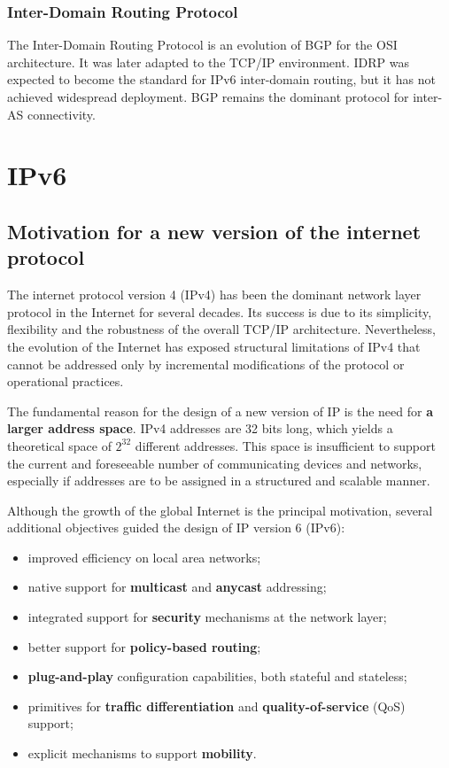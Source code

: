 \documentclass[11pt,a4paper,openany]{report}
\begin{document}
\subsection{Inter-Domain Routing Protocol}

The Inter-Domain Routing Protocol is an evolution of BGP for the OSI architecture. It was later adapted to the TCP/IP environment. IDRP was expected to become the standard for IPv6 inter-domain routing, but it has not achieved widespread deployment. BGP remains the dominant protocol for inter-AS connectivity.

\chapter{IPv6}

\section{Motivation for a new version of the internet protocol}

The internet protocol version 4 (IPv4) has been the dominant network layer protocol in the Internet for several decades. Its success is due to its simplicity, flexibility and the robustness of the overall TCP/IP architecture. Nevertheless, the evolution of the Internet has exposed structural limitations of IPv4 that cannot be addressed only by incremental modifications of the protocol or operational practices.

The fundamental reason for the design of a new version of IP is the need for \textbf{a larger address space}. IPv4 addresses are 32 bits long, which yields a theoretical space of $2^{32}$ different addresses. This space is insufficient to support the current and foreseeable number of communicating devices and networks, especially if addresses are to be assigned in a structured and scalable manner.

Although the growth of the global Internet is the principal motivation, several additional objectives guided the design of IP version 6 (IPv6):

\begin{itemize}
\item improved efficiency on local area networks;
\item native support for \textbf{multicast} and \textbf{anycast} addressing;
\item integrated support for \textbf{security} mechanisms at the network layer;
\item better support for \textbf{policy-based routing};
\item \textbf{plug-and-play} configuration capabilities, both stateful and stateless;
\item primitives for \textbf{traffic differentiation} and \textbf{quality-of-service} (QoS) support;
\item explicit mechanisms to support \textbf{mobility}.
\end{itemize}
\end{document}
